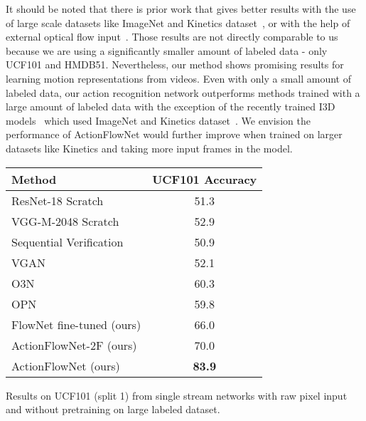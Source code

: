 \documentclass[10pt,twocolumn,letterpaper]{article}
\begin{document}
It should be noted that there is prior work that gives better results with the use of large scale datasets like ImageNet and Kinetics dataset~\cite{carreira2017quo}, or with the help of external optical flow input~\cite{simonyanZ14a}. Those results are not directly comparable to us because we are using a significantly smaller amount of labeled data - only UCF101 and HMDB51.
Nevertheless, our method shows promising results for learning motion representations from videos. Even with only a small amount of labeled data, our action recognition network outperforms methods trained with a large amount of labeled data with the exception of the recently trained I3D models~\cite{carreira2017quo} which used ImageNet and Kinetics dataset~\cite{kay2017kinetics}.
We envision the performance of ActionFlowNet would further improve when trained on larger datasets like Kinetics and taking more input frames in the model. 
  \vspace{-.5em}
\begin{center}
    \begin{tabular}{l|c}
      \hline
      Method & UCF101 Accuracy \\
    \hline\hline
    ResNet-18 Scratch         & 51.3 \\
    VGG-M-2048 Scratch~\cite{simonyanZ14a} & 52.9 \\
    Sequential Verification~\cite{misra2016shuffle} & 50.9 \\
    VGAN~\cite{vondrick2016generating} & 52.1 \\
    O3N~\cite{fernando2016self} & 60.3 \\
    OPN~\cite{lee2017unsupervised} & 59.8 \\
    \hline
    FlowNet fine-tuned (ours) & 66.0 \\
    ActionFlowNet-2F (ours)  & 70.0 \\
    \hline
    ActionFlowNet (ours)  & \textbf{83.9} \\
      \hline
    \end{tabular}
    \vspace{-1em}
\end{center}
  \caption{Results on UCF101 (split 1) from single stream networks with raw pixel input and without pretraining on large labeled dataset.}
  \vspace{-1em}
\label{tab:compare_recent}
\end{document}
